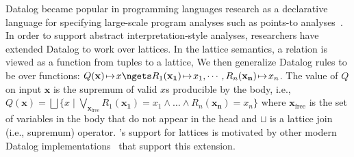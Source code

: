 Datalog became popular in programming languages research 
  as a declarative language for specifying large-scale program analyses
  such as points-to analyses~\cite{doop-datalog}.
In order to support abstract interpretation-style analyses,
  researchers have extended Datalog to work over lattices.
In the lattice semantics,
 a relation is viewed as a function from tuples to a lattice,
We then generalize Datalog rules to be over functions:
\(
  Q(\mathbf{x}) \!\mapsto\! x
  \ngets 
  R_1(\mathbf{x_1}) \!\mapsto\! x_1, 
  \cdots, 
  R_n(\mathbf{x_n})\!\mapsto\! x_n
\).
The value of $Q$ on input $\mathbf{x}$ is 
 the supremum of valid $x$s producible by the body, i.e.,
$Q(\mathbf{x})=
  \bigsqcup
  \{
    x \mid
    \bigvee_{\mathbf{x}_\text{free}}
    R_1(\mathbf{x_1})=x_1 \land
    \ldots\land
    R_n(\mathbf{x_n})=x_n
  \}
$
where $\mathbf{x}_\text{free}$ is the set of variables in the body 
 that do not appear in the head and $\sqcup$ is 
 a lattice join (i.e., supremum) operator.
\Egglog's support for lattices
 is motivated by other 
 modern Datalog implementations~\cite{datalogo,ascent,flix}
 that support this extension.

